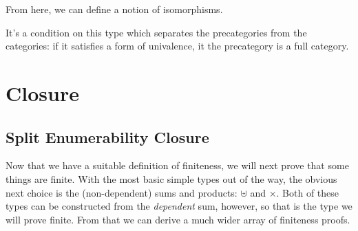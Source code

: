 From here, we can define a notion of isomorphisms.
\begin{agdalisting}
\end{agdalisting}
It's a condition on this type which separates the precategories from the
categories: if it satisfies a form of univalence, it the precategory is a full
category.
\begin{agdalisting}
\end{agdalisting}

\section{Closure}
\subsection{Split Enumerability Closure}
Now that we have a suitable definition of finiteness, we will next prove that
some things are finite.
With the most basic simple types out of the way, the obvious next choice is the
(non-dependent) sums and products: \(\uplus\) and \(\times\).
Both of these types can be constructed from the \emph{dependent} sum, however,
so that is the type we will prove finite.
From that we can derive a much wider array of finiteness proofs.

